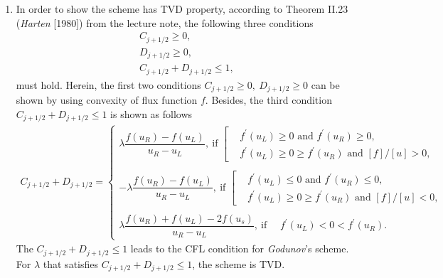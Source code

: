 \documentclass[12pt]{article}
\begin{document}
\begin{enumerate}
	\item In order to show the scheme has TVD property,
	      according to Theorem II.23 (\emph{Harten} [1980]) from the lecture note,
	      the following three conditions
	      \begin{equation*}
		      \boxed{
			      \begin{aligned}
				      C_{j+1/2} \geq 0, \\
				      D_{j+1/2} \geq 0, \\
				      C_{j+1/2} + D_{j+1/2} \leq 1,
			      \end{aligned}
		      }
	      \end{equation*}
	      must hold. Herein, the first two conditions $C_{j+1/2} \geq 0,\ D_{j+1/2} \geq 0$
	      can be shown by using convexity of flux function $f$.
	      Besides, the third condition $C_{j+1/2} + D_{j+1/2} \leq 1$ is shown as follows
	      \begin{align*}
		      C_{j+1/2} + D_{j+1/2}
		      = \begin{cases}
			      \lambda \dfrac{f(u_R) - f(u_L)}{u_R-u_L}, \  \text{if }
			      \left[
			      \begin{aligned}
				       & f^\prime(u_L) \geq 0 \text{ and } f^\prime(u_R) \geq 0,         \\
				       & f^\prime(u_L) \geq 0 \geq f^\prime(u_R) \text{ and } [f]/[u]>0,
			      \end{aligned}
			      \right.
			      \\
			      \\
			      - \lambda \dfrac{f(u_R) - f(u_L)}{u_R-u_L},  \  \text{if }
			      \left[
			      \begin{aligned}
				       & f^\prime(u_L) \leq 0 \text{ and } f^\prime(u_R) \leq 0,         \\
				       & f^\prime(u_L) \geq 0 \geq f^\prime(u_R) \text{ and } [f]/[u]<0,
			      \end{aligned}
			      \right.
			      \\
			      \\
			      \lambda \dfrac{f(u_R) + f(u_L) -2 f(u_s)}{u_R-u_L}, \  \text{if } \quad
			      f^\prime(u_L) < 0 <  f^\prime(u_R).
		      \end{cases}
	      \end{align*}
	      The $C_{j+1/2}+ D_{j+1/2} \leq 1$ leads to the CFL condition for \emph{Godunov}'s scheme.\\
	      For $\lambda$ that satisfies $C_{j+1/2}+ D_{j+1/2} \leq 1$, the scheme is TVD.
\end{enumerate}
\end{document}
